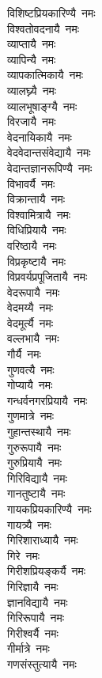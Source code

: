 \begin{flushleft}
\begin{multicols}{2}
विशिष्टप्रियकारिण्यै~नमः\\
विश्वतोवदनायै~नमः\\
व्याप्तायै~नमः\\
व्यापिन्यै~नमः\\
व्यापकात्मिकायै~नमः\\
व्यालघ्न्यै~नमः\\
व्यालभूषाङ्ग्यै~नमः\\
विरजायै~नमः\hfill{}\\
वेदनायिकायै~नमः\\
वेदवेदान्तसंवेद्यायै~नमः\\
वेदान्तज्ञानरूपिण्यै~नमः\\
विभावर्यै~नमः\\
विक्रान्तायै~नमः\\
विश्वामित्रायै~नमः\\
विधिप्रियायै~नमः\\
वरिष्ठायै~नमः\\
विप्रकृष्टायै~नमः\\
विप्रवर्यप्रपूजितायै~नमः\hfill{}\\
वेदरूपायै~नमः\\
वेदमय्यै~नमः\\
वेदमूर्त्यै~नमः\\
वल्लभायै~नमः\\
गौर्यै~नमः\\
गुणवत्यै~नमः\\
गोप्यायै~नमः\\
गन्धर्वनगरप्रियायै~नमः\\
गुणमात्रे~नमः\\
गुहान्तस्थायै~नमः\hfill{}\\
गुरुरूपायै~नमः\\
गुरुप्रियायै~नमः\\
गिरिविद्यायै~नमः\\
गानतुष्टायै~नमः\\
गायकप्रियकारिण्यै~नमः\\
गायत्र्यै~नमः\\
गिरिशाराध्यायै~नमः\\
गिरे~नमः\\
गिरीशप्रियङ्कर्यै~नमः\\
गिरिज्ञायै~नमः\hfill{}\\
ज्ञानविद्यायै~नमः\\
गिरिरूपायै~नमः\\
गिरीश्वर्यै~नमः\\
गीर्मात्रे~नमः\\
गणसंस्तुत्यायै~नमः\\

\end{multicols}
\end{flushleft}
